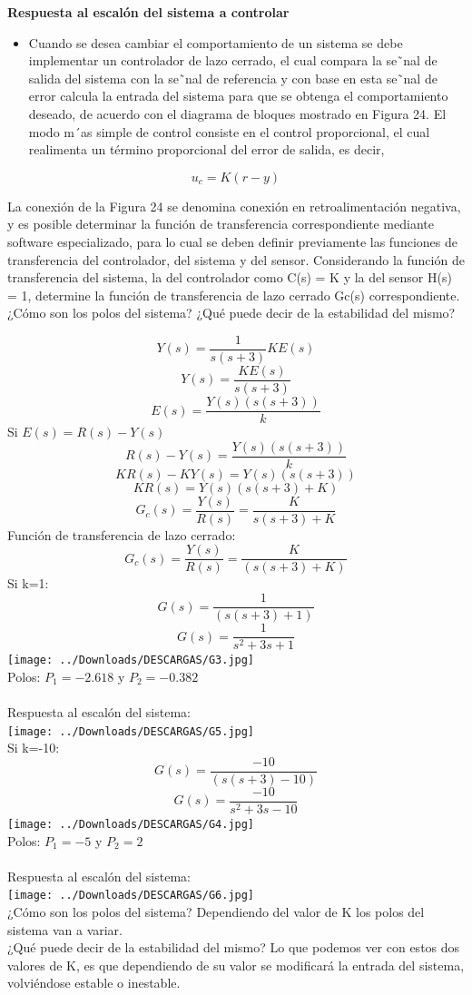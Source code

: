 \textbf{Respuesta al escalón del sistema a controlar}

\begin{itemize}
	\item Cuando se desea cambiar el comportamiento de un sistema se debe implementar un controlador de lazo
	cerrado, el cual compara la se˜nal de salida del sistema con la se˜nal de referencia y con base en esta se˜nal
	de error calcula la entrada del sistema para que se obtenga el comportamiento deseado, de acuerdo con
	el diagrama de bloques mostrado en Figura 24. El modo m´as simple de control consiste en el control
	proporcional, el cual realimenta un término proporcional del error de salida, es decir,
\end{itemize}

\begin{equation*}
	u_c=K(r-y)
\end{equation*}

La conexión de la Figura 24 se denomina conexión en retroalimentación negativa, y es posible determinar la función de transferencia correspondiente mediante software especializado, para lo cual se deben definir
previamente las funciones de transferencia del controlador, del sistema y del sensor. Considerando la función de transferencia del sistema, la del controlador como C(s) = K y la del sensor H(s) = 1, determine
la función de transferencia de lazo cerrado Gc(s) correspondiente. ¿Cómo son los polos del sistema? ¿Qué puede decir de la estabilidad del mismo?

$$Y(s)=\frac{1}{s(s+3)}KE(s)$$
$$Y(s)=\frac{KE(s)}{s(s+3)}$$
$$E(s)=\frac{Y(s)(s(s+3))}{k}$$
Si $E(s)=R(s)-Y(s)$
$$R(s)-Y(s)=\frac{Y(s)(s(s+3))}{k}$$
$$KR(s)-KY(s)=Y(s)(s(s+3))$$
$$KR(s)=Y(s)(s(s+3)+K)$$
$$G_{c}(s)=\frac{Y(s)}{R(s)}=\frac{K}{s(s+3)+K}$$
Función de transferencia de lazo cerrado:
$$G_{c}(s)=\frac{Y(s)}{R(s)}=\frac{K}{(s(s+3)+K)}$$	
Si k=1:
$$G(s)=\frac{1}{(s(s+3)+1)}$$	
$$G(s)=\frac{1}{s^{2}+3s+1}$$	
\texttt{[image: ../Downloads/DESCARGAS/G3.jpg]}\\ 
Polos: $P_{1}=-2.618$ y $P_{2}=-0.382$\\\\
Respuesta al escalón del sistema:\\
\texttt{[image: ../Downloads/DESCARGAS/G5.jpg]}\\
Si k=-10:
$$G(s)=\frac{-10}{(s(s+3)-10)}$$	
$$G(s)=\frac{-10}{s^{2}+3s-10}$$
\texttt{[image: ../Downloads/DESCARGAS/G4.jpg]}\\ 	
Polos: $P_{1}=-5$ y $P_{2}=2$\\\\
Respuesta al escalón del sistema:\\
\texttt{[image: ../Downloads/DESCARGAS/G6.jpg]}\\
¿Cómo son los polos del sistema? Dependiendo del valor de K los polos del sistema van a variar.\\
¿Qué puede decir de la estabilidad del mismo? Lo que podemos ver con estos dos valores de K, es que dependiendo de su valor se modificará la entrada del sistema, volviéndose estable o inestable.

